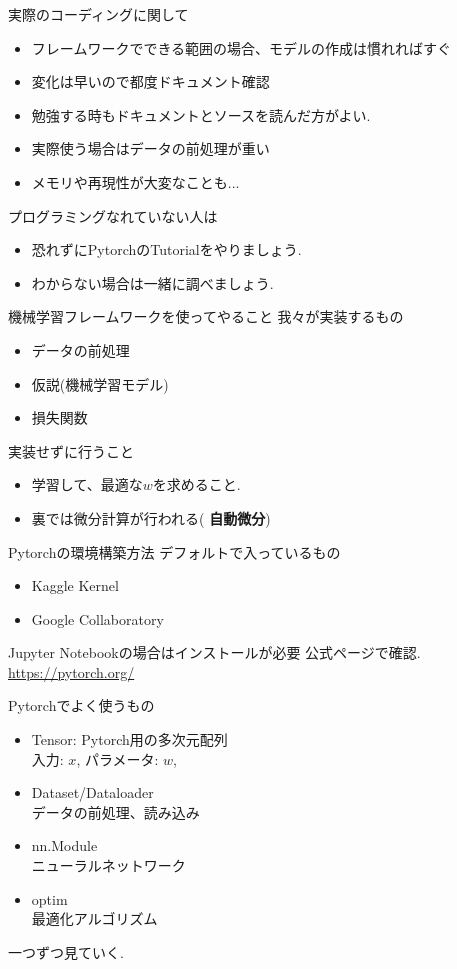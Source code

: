\begin{frame}[fragile]{実際のコーディングに関して}
\begin{itemize}
\item フレームワークでできる範囲の場合、モデルの作成は慣れればすぐ
\item 変化は早いので都度ドキュメント確認
\item 勉強する時もドキュメントとソースを読んだ方がよい.
\item 実際使う場合はデータの前処理が重い
\item メモリや再現性が大変なことも...
\end{itemize}
\end{frame}


\begin{frame}[fragile]{プログラミングなれていない人は}
\begin{itemize}
\item 恐れずにPytorchのTutorialをやりましょう.
\item わからない場合は一緒に調べましょう.
\end{itemize}
\end{frame}


\begin{frame}[fragile]{機械学習フレームワークを使ってやること}
我々が実装するもの
\begin{itemize}
  \item データの前処理
  \item 仮説(機械学習モデル)
  \item 損失関数
\end{itemize}
実装せずに行うこと
\begin{itemize}
  \item 学習して、最適な$w$を求めること.
  \item 裏では微分計算が行われる( \textbf{自動微分})
\end{itemize}
\end{frame}


\begin{frame}[fragile]{Pytorchの環境構築方法}
デフォルトで入っているもの
\begin{itemize}
  \item Kaggle Kernel
  \item Google Collaboratory
\end{itemize}
Jupyter Notebookの場合はインストールが必要
  公式ページで確認.
  \url{https://pytorch.org/}
\end{frame}


\begin{frame}[fragile]{Pytorchでよく使うもの}
\begin{itemize}
\item Tensor: Pytorch用の多次元配列 \\
  入力: $x$, パラメータ: $w$,
\item Dataset/Dataloader \\
  データの前処理、読み込み
\item nn.Module \\
  ニューラルネットワーク
\item optim \\
  最適化アルゴリズム
\end{itemize}
一つずつ見ていく.
\end{frame}


